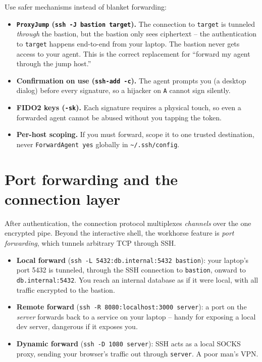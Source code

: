 \begin{whybox}
Use safer mechanisms instead of blanket forwarding:
\begin{itemize}
  \item \textbf{\texttt{ProxyJump} (\texttt{ssh -J bastion target}).} The connection to \texttt{target} is tunneled \emph{through} the bastion, but the bastion only sees ciphertext -- the authentication to \texttt{target} happens end-to-end from your laptop. The bastion never gets access to your agent. This is the correct replacement for ``forward my agent through the jump host.''
  \item \textbf{Confirmation on use (\texttt{ssh-add -c}).} The agent prompts you (a desktop dialog) before every signature, so a hijacker on \texttt{A} cannot sign silently.
  \item \textbf{FIDO2 keys (\texttt{-sk}).} Each signature requires a physical touch, so even a forwarded agent cannot be abused without you tapping the token.
  \item \textbf{Per-host scoping.} If you must forward, scope it to one trusted destination, never \texttt{ForwardAgent yes} globally in \texttt{\textasciitilde/.ssh/config}.
\end{itemize}
\end{whybox}

\section{Port forwarding and the connection layer}

After authentication, the connection protocol multiplexes \emph{channels} over the one encrypted pipe. Beyond the interactive shell, the workhorse feature is \emph{port forwarding}, which tunnels arbitrary TCP through SSH.

\begin{itemize}
  \item \textbf{Local forward} (\texttt{ssh -L 5432:db.internal:5432 bastion}): your laptop's port 5432 is tunneled, through the SSH connection to \texttt{bastion}, onward to \texttt{db.internal:5432}. You reach an internal database as if it were local, with all traffic encrypted to the bastion.
  \item \textbf{Remote forward} (\texttt{ssh -R 8080:localhost:3000 server}): a port on the \emph{server} forwards back to a service on your laptop -- handy for exposing a local dev server, dangerous if it exposes you.
  \item \textbf{Dynamic forward} (\texttt{ssh -D 1080 server}): SSH acts as a local SOCKS proxy, sending your browser's traffic out through \texttt{server}. A poor man's VPN.
\end{itemize}

